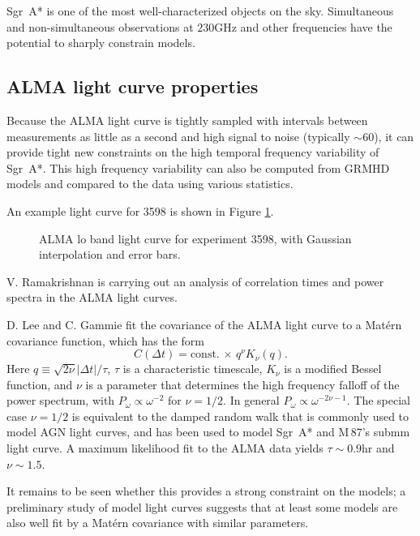 \documentclass[twocolumn,tighten,dvipsnames]{aastex63}
\newcommand\sgra{Sgr~A*\xspace}
\def\M87{M\,87\xspace}
\newcommand\<{{\langle}}
\renewcommand\>{{\rangle}} %
\begin{document}
\sgra is one of the most well-characterized objects on the sky. Simultaneous and non-simultaneous observations at $230$GHz and  other frequencies have the potential to sharply constrain models.

\subsection{ALMA light curve properties}
\label{sec:lcconst}

Because the ALMA light curve is tightly sampled with intervals  between measurements as little as a second and high signal to noise (typically $\sim 60$), it can provide tight new constraints on the high temporal frequency variability of \sgra.  This high frequency variability can also be computed from GRMHD models and compared to the data using various statistics.

An example light curve for 3598 is shown in Figure \ref{fig:LC3598}.

\begin{figure}
    \centering
    \caption{ALMA lo band light curve for experiment 3598, with Gaussian interpolation and error bars.}
    \label{fig:LC3598}
\end{figure}

V. Ramakrishnan is carrying out an analysis of correlation times and power spectra in the ALMA light curves.

D. Lee and C. Gammie fit the covariance of the ALMA light curve to a Mat\'ern covariance function, which has the form
\begin{equation}
    C(\Delta t) = \mbox{const.} \, \times \, q^\nu K_\nu(q).
\end{equation}
Here $q \equiv \sqrt{2\nu} |\Delta t|/\tau$, $\tau$ is a characteristic timescale, $K_\nu$ is a modified Bessel function, and $\nu$ is a parameter that determines the high frequency falloff of the power spectrum, with $P_\omega \propto \omega^{-2}$ for $\nu = 1/2$.  In general $P_\omega \propto \omega^{-2\nu - 1}$. The special case $\nu = 1/2$ is equivalent to the damped random walk that is commonly used to model AGN light curves, and has been used to model \sgra and \M87's submm light curve. A maximum likelihood fit to the ALMA data yields $\tau \sim 0.9$hr and $\nu \sim 1.5$.

It remains to be seen whether this provides a strong constraint on the models; a preliminary study of model light curves suggests that at least some models are also well fit by a Mat\'ern covariance with similar parameters.
\end{document}
